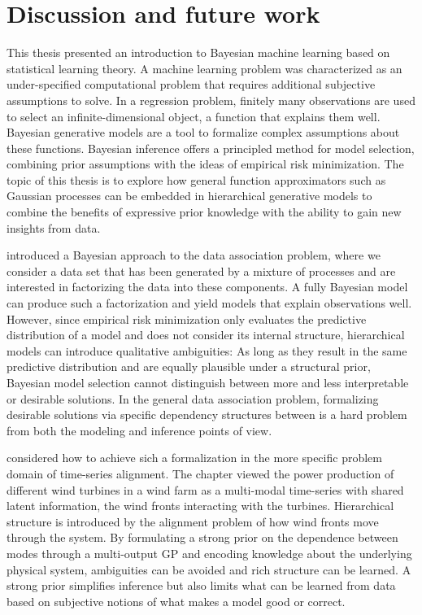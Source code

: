 \chapter{Discussion and future work}
\label{toc:discussion}
This thesis presented an introduction to Bayesian machine learning based on statistical learning theory.
A machine learning problem was characterized as an under-specified computational problem that requires additional subjective assumptions to solve.
In a regression problem, finitely many observations are used to select an infinite-dimensional object, a function that explains them well.
Bayesian generative models are a tool to formalize complex assumptions about these functions.
Bayesian inference offers a principled method for model selection, combining prior assumptions with the ideas of empirical risk minimization.
The topic of this thesis is to explore how general function approximators such as Gaussian processes can be embedded in hierarchical generative models to combine the benefits of expressive prior knowledge with the ability to gain new insights from data.

 introduced a Bayesian approach to the data association problem, where we consider a data set that has been generated by a mixture of processes and are interested in factorizing the data into these components.
A fully Bayesian model can produce such a factorization and yield models that explain observations well.
However, since empirical risk minimization only evaluates the predictive distribution of a model and does not consider its internal structure, hierarchical models can introduce qualitative ambiguities:
As long as they result in the same predictive distribution and are equally plausible under a structural prior, Bayesian model selection cannot distinguish between more and less interpretable or desirable solutions.
In the general data association problem, formalizing desirable solutions via specific dependency structures between is a hard problem from both the modeling and inference points of view.

 considered how to achieve sich a formalization in the more specific problem domain of time-series alignment.
The chapter viewed the power production of different wind turbines in a wind farm as a multi-modal time-series with shared latent information, the wind fronts interacting with the turbines.
Hierarchical structure is introduced by the alignment problem of how wind fronts move through the system.
By formulating a strong prior on the dependence between modes through a multi-output GP and encoding knowledge about the underlying physical system, ambiguities can be avoided and rich structure can be learned.
A strong prior simplifies inference but also limits what can be learned from data based on subjective notions of what makes a model good or correct.

